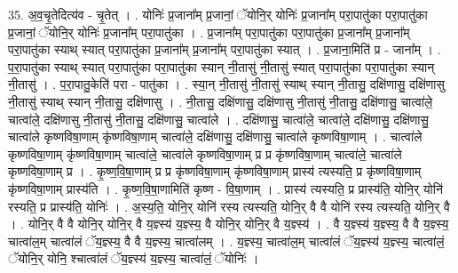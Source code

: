 \documentclass[17pt]{extarticle}
\begin{document}
35. अ॒व॒चृ॒तेदित्य॑व - चृ॒तेत् । . योनिः॑ प्र॒जाना᳚म् प्र॒जानां॒ ॅयोनि॒र् योनिः॑ प्र॒जाना᳚म् परा॒पातु॑का परा॒पातु॑का प्र॒जानां॒ ॅयोनि॒र् योनिः॑ प्र॒जाना᳚म् परा॒पातु॑का । . प्र॒जाना᳚म् परा॒पातु॑का परा॒पातु॑का प्र॒जाना᳚म् प्र॒जाना᳚म् परा॒पातु॑का स्याथ् स्यात् परा॒पातु॑का प्र॒जाना᳚म् प्र॒जाना᳚म् परा॒पातु॑का स्यात् । . प्र॒जाना॒मिति॑ प्र - जाना᳚म् । . प॒रा॒पातु॑का स्याथ् स्यात् परा॒पातु॑का परा॒पातु॑का स्यान् नी॒तासु॑ नी॒तासु॑ स्यात् परा॒पातु॑का परा॒पातु॑का स्यान् नी॒तासु॑ । . प॒रा॒पातु॒केति॑ परा - पातु॑का । . स्या॒न् नी॒तासु॑ नी॒तासु॑ स्याथ् स्यान् नी॒तासु॒ दक्षि॑णासु॒ दक्षि॑णासु नी॒तासु॑ स्याथ् स्यान् नी॒तासु॒ दक्षि॑णासु । . नी॒तासु॒ दक्षि॑णासु॒ दक्षि॑णासु नी॒तासु॑ नी॒तासु॒ दक्षि॑णासु॒ चात्वा॑ले॒ चात्वा॑ले॒ दक्षि॑णासु नी॒तासु॑ नी॒तासु॒ दक्षि॑णासु॒ चात्वा॑ले । . दक्षि॑णासु॒ चात्वा॑ले॒ चात्वा॑ले॒ दक्षि॑णासु॒ दक्षि॑णासु॒ चात्वा॑ले कृष्णविषा॒णाम् कृ॑ष्णविषा॒णाम् चात्वा॑ले॒ दक्षि॑णासु॒ दक्षि॑णासु॒ चात्वा॑ले कृष्णविषा॒णाम् । . चात्वा॑ले कृष्णविषा॒णाम् कृ॑ष्णविषा॒णाम् चात्वा॑ले॒ चात्वा॑ले कृष्णविषा॒णाम् प्र प्र कृ॑ष्णविषा॒णाम् चात्वा॑ले॒ चात्वा॑ले कृष्णविषा॒णाम् प्र । . कृ॒ष्ण॒वि॒षा॒णाम् प्र प्र कृ॑ष्णविषा॒णाम् कृ॑ष्णविषा॒णाम् प्रास्य॑ त्यस्यति॒ प्र कृ॑ष्णविषा॒णाम् कृ॑ष्णविषा॒णाम् प्रास्य॑ति । . कृ॒ष्ण॒वि॒षा॒णामिति॑ कृष्ण - वि॒षा॒णाम् । . प्रास्य॑ त्यस्यति॒ प्र प्रास्य॑ति॒ योनि॒र् योनि॑ रस्यति॒ प्र प्रास्य॑ति॒ योनिः॑ । . अ॒स्य॒ति॒ योनि॒र् योनि॑ रस्य त्यस्यति॒ योनि॒र् वै वै योनि॑ रस्य त्यस्यति॒ योनि॒र् वै । . योनि॒र् वै वै योनि॒र् योनि॒र् वै य॒ज्ञ्स्य॑ य॒ज्ञ्स्य॒ वै योनि॒र् योनि॒र् वै य॒ज्ञ्स्य॑ । . वै य॒ज्ञ्स्य॑ य॒ज्ञ्स्य॒ वै वै य॒ज्ञ्स्य॒ चात्वा॑ल॒म् चात्वा॑लं ॅय॒ज्ञ्स्य॒ वै वै य॒ज्ञ्स्य॒ चात्वा॑लम् । . य॒ज्ञ्स्य॒ चात्वा॑ल॒म् चात्वा॑लं ॅय॒ज्ञ्स्य॑ य॒ज्ञ्स्य॒ चात्वा॑लं॒ ॅयोनि॒र् योनि॒ श्चात्वा॑लं ॅय॒ज्ञ्स्य॑ य॒ज्ञ्स्य॒ चात्वा॑लं॒ ॅयोनिः॑ । \newline
\end{document}
